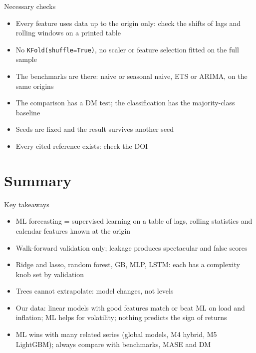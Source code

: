 \begin{frame}{Necessary checks}
\itemsize{\small}
\begin{itemize}
    \item Every feature uses data up to the origin only: check the shifts of lags and rolling windows on a printed table
    \item No \texttt{KFold(shuffle=True)}, no scaler or feature selection fitted on the full sample
    \item The benchmarks are there: naive or seasonal naive, ETS or ARIMA, on the same origins
    \item The comparison has a DM test; the classification has the majority-class baseline
    \item Seeds are fixed and the result survives another seed
    \item Every cited reference exists: check the DOI
\end{itemize}
\end{frame}


\section{Summary}

\begin{frame}{Key takeaways}
\itemsize{\small}
\begin{itemize}
    \item ML forecasting = supervised learning on a table of lags, rolling statistics and calendar features known at the origin
    \item Walk-forward validation only; leakage produces spectacular and false scores
    \item Ridge and lasso, random forest, GB, MLP, LSTM: each has a complexity knob set by validation
    \item Trees cannot extrapolate: model changes, not levels
    \item Our data: linear models with good features match or beat ML on load and inflation; ML helps for volatility; nothing predicts the sign of returns
    \item ML wins with many related series (global models, M4 hybrid, M5 LightGBM); always compare with benchmarks, MASE and DM
\end{itemize}
\end{frame}

